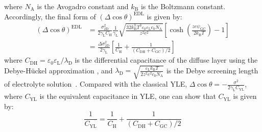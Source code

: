 where \(N_{\mathrm{A}}\) is the Avogadro constant and \(k_{\mathrm{B}}\)
is the Boltzmann constant. Accordingly, the final form
of \((\Delta \cos \theta)^{\mathrm{EDL}}\) is given by:
\begin{equation}
\label{eqn:wet-Delta-cos-EDL-final}
\begin{aligned}
(\Delta \cos \theta)^{\mathrm{EDL}} &= \frac{\sigma_{\mathrm{2D}}^{2}}{2\gamma_{\mathrm{L}}
                                       C_{\mathrm{H}}}\frac{1}{\gamma_{\mathrm{L}}}
                                       \sqrt{\frac{32k_{\mathrm{B}}^{3}T^{3} \varepsilon_{0}\varepsilon_{\mathrm{L}} c_{0} 
                                       N_{\mathrm{A}}}{z^{2}e^{2}}} 
                                       \left[\cosh(\frac{z e \psi_{\mathrm{GC}}}{2k_{\mathrm{B}} T}) -1 \right]\\
                                    &= \frac{\Delta \sigma_{\mathrm{2D}}^{2}}{2\gamma_{\mathrm{L}}}
                                       \left[ \frac{1}{C_{\mathrm{H}}} + \frac{1}{(C_{\mathrm{DH}} + 
                                       C_{\mathrm{GC}})/2}\right]
\end{aligned}
\end{equation}
where
\(C_{\mathrm{DH}}=\varepsilon_{0}\varepsilon_{\mathrm{L}}/\lambda_{\mathrm{D}}\)
is the differential capacitance of the diffuse layer using the
Debye-Hückel approximation \autocite{Bard_1980_electrochem_book}, and
\(\lambda_{\mathrm{D}}=\sqrt{\frac{\varepsilon_{\mathrm{L}}k_{\mathrm{B}}T}{2z^{2}e^{2}c_{0}N_{\mathrm{A}}}}\)
is the Debye screening length of electrolyte
solution~\autocite{Conway_1951_dielectric_Helmholtz}. Compared with the
classical YLE,
\(\Delta \cos \theta =
-\frac{\sigma^{2}}{2\gamma_{\mathrm{L}}C_{\mathrm{YL}}}\), where
\(C_{\mathrm{YL}}\) is the equivalent capacitance in YLE, one can show
that \(C_{\mathrm{YL}}\) is given by:
\begin{equation}
\label{eqn:wet-CYL-model}
\frac{1}{C_{\mathrm{YL}}} = \frac{1}{C_{\mathrm{H}}} + \frac{1}{(C_{\mathrm{DH}} + C_{\mathrm{GC}})/2}
\end{equation}


